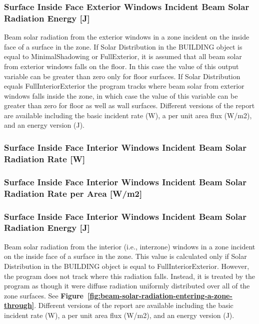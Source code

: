 \subsubsection{Surface Inside Face Exterior Windows Incident Beam Solar Radiation Energy {[}J{]}}\label{surface-inside-face-exterior-windows-incident-beam-solar-radiation-energy-j}

Beam solar radiation from the exterior windows in a zone incident on the inside face of a surface in the zone. If Solar Distribution in the BUILDING object is equal to MinimalShadowing or FullExterior, it is assumed that all beam solar from exterior windows falls on the floor. In this case the value of this output variable can be greater than zero only for floor surfaces. If Solar Distribution equals FullInteriorExterior the program tracks where beam solar from exterior windows falls inside the zone, in which case the value of this variable can be greater than zero for floor as well as wall surfaces. Different versions of the report are available including the basic incident rate (W), a per unit area flux (W/m2), and an energy version (J).

\subsubsection{Surface Inside Face Interior Windows Incident Beam Solar Radiation Rate {[}W{]}}\label{surface-inside-face-interior-windows-incident-beam-solar-radiation-rate-w}

\subsubsection{Surface Inside Face Interior Windows Incident Beam Solar Radiation Rate per Area {[}W/m2{]}}\label{surface-inside-face-interior-windows-incident-beam-solar-radiation-rate-per-area-wm2}

\subsubsection{Surface Inside Face Interior Windows Incident Beam Solar Radiation Energy {[}J{]}}\label{surface-inside-face-interior-windows-incident-beam-solar-radiation-energy-j}

Beam solar radiation from the interior (i.e., interzone) windows in a zone incident on the inside face of a surface in the zone. This value is calculated only if Solar Distribution in the BUILDING object is equal to FullInteriorExterior. However, the program does not track where this radiation falls. Instead, it is treated by the program as though it were diffuse radiation uniformly distributed over all of the zone surfaces. See \textbf{Figure~\ref{fig:beam-solar-radiation-entering-a-zone-through}}. Different versions of the report are available including the basic incident rate (W), a per unit area flux (W/m2), and an energy version (J).


